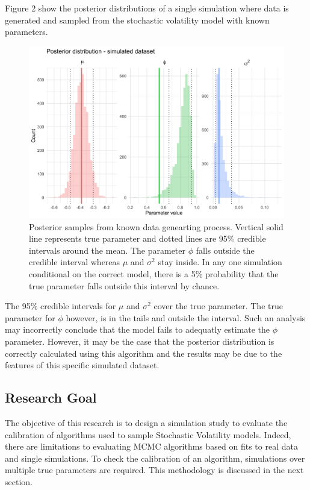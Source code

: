 \documentclass[12pt, a4paper]{article}
\begin{document}
    Figure 2 show the posterior distributions of a single simulation where data is generated and sampled from the stochastic volatility model with known parameters.

    \begin{figure}[h]
        \centering
        \includegraphics[scale=0.1]{motivating_example/single_sim.png}
        \caption{Posterior samples from known data genearting process. Vertical solid line represents true parameter and dotted lines are 95\% credible intervals around the mean. The parameter $\phi$ falls outside the credible interval whereas $\mu$ and $\sigma^2$ stay inside. In any one simulation conditional on the correct model, there is a 5\% probability that the true parameter falls outside this interval by chance.}
    \end{figure}

    The 95\% credible intervals for $\mu$ and $\sigma^2$ cover the true parameter. The true parameter for $\phi$ however, is in the tails and outside the interval. Such an analysis may incorrectly conclude that the model fails to adequatly estimate the $\phi$ parameter. However, it may be the case that the posterior distribution is correctly calculated using this algorithm and the results may be due to the features of this specific simulated dataset.

\subsection{Research Goal}
    The objective of this research is to design a simulation study to evaluate the calibration of algorithms used to sample Stochastic Volatility models. Indeed, there are limitations to evaluating MCMC algorithms based on fits to real data and single simulations. To check the calibration of an algorithm, simulations over multiple true parameters are required. This methodology is discussed in the next section. 
\end{document}
